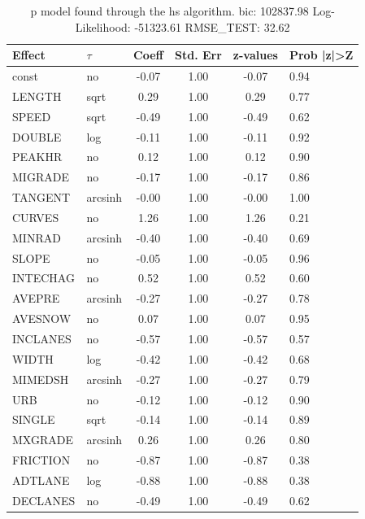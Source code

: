 \begin{table}
	\caption{p model found through the hs algorithm. bic: 102837.98 Log-Likelihood: -51323.61 RMSE_TEST: 32.62}
	\begin{center}
		\begin{tabular}{|l|l|c|c|c|l|}
			\hline
			Effect & $\tau$ & Coeff & Std. Err & z-values & Prob |z|>Z \\
			\hline
			const & no & -0.07 & 1.00 & -0.07 & 0.94 \\
			\hline
			LENGTH & sqrt & 0.29 & 1.00 & 0.29 & 0.77 \\
			\hline
			SPEED & sqrt & -0.49 & 1.00 & -0.49 & 0.62 \\
			\hline
			DOUBLE & log & -0.11 & 1.00 & -0.11 & 0.92 \\
			\hline
			PEAKHR & no & 0.12 & 1.00 & 0.12 & 0.90 \\
			\hline
			MIGRADE & no & -0.17 & 1.00 & -0.17 & 0.86 \\
			\hline
			TANGENT & arcsinh & -0.00 & 1.00 & -0.00 & 1.00 \\
			\hline
			CURVES & no & 1.26 & 1.00 & 1.26 & 0.21 \\
			\hline
			MINRAD & arcsinh & -0.40 & 1.00 & -0.40 & 0.69 \\
			\hline
			SLOPE & no & -0.05 & 1.00 & -0.05 & 0.96 \\
			\hline
			INTECHAG & no & 0.52 & 1.00 & 0.52 & 0.60 \\
			\hline
			AVEPRE & arcsinh & -0.27 & 1.00 & -0.27 & 0.78 \\
			\hline
			AVESNOW & no & 0.07 & 1.00 & 0.07 & 0.95 \\
			\hline
			INCLANES & no & -0.57 & 1.00 & -0.57 & 0.57 \\
			\hline
			WIDTH & log & -0.42 & 1.00 & -0.42 & 0.68 \\
			\hline
			MIMEDSH & arcsinh & -0.27 & 1.00 & -0.27 & 0.79 \\
			\hline
			URB & no & -0.12 & 1.00 & -0.12 & 0.90 \\
			\hline
			SINGLE & sqrt & -0.14 & 1.00 & -0.14 & 0.89 \\
			\hline
			MXGRADE & arcsinh & 0.26 & 1.00 & 0.26 & 0.80 \\
			\hline
			FRICTION & no & -0.87 & 1.00 & -0.87 & 0.38 \\
			\hline
			ADTLANE & log & -0.88 & 1.00 & -0.88 & 0.38 \\
			\hline
			DECLANES & no & -0.49 & 1.00 & -0.49 & 0.62 \\
			\hline

\end{tabular}
\end{center}
\end{table}
